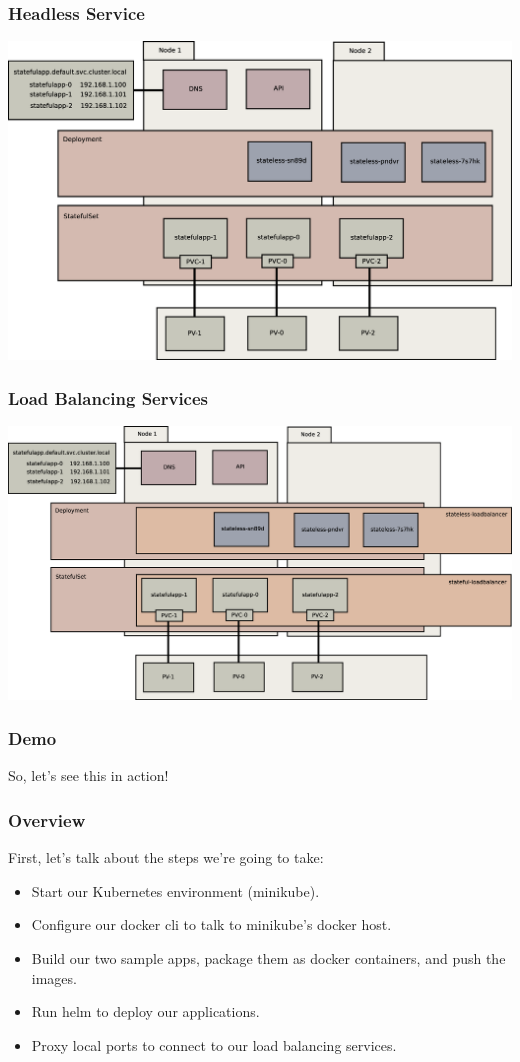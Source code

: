 \documentclass{beamer}
\begin{document}
\begin{frame}
    \frametitle{Headless Service}
    \includegraphics[width=\textwidth,height=\textheight,keepaspectratio]{graphics/07-persistentIdentity.eps}
\end{frame}

\begin{frame}
    \frametitle{Load Balancing Services}
    \includegraphics[width=\textwidth,height=\textheight,keepaspectratio]{graphics/08-loadBalancer.eps}
\end{frame}

\begin{frame}
    \frametitle{Demo}
    \begin{center}
        \Huge So, let's see this in action!
    \end{center}
\end{frame}

\begin{frame}
    \frametitle{Overview}
    First, let's talk about the steps we're going to take:
    \begin{itemize}
        \item Start our Kubernetes environment (minikube).
        \item Configure our docker cli to talk to minikube's docker host.
        \item Build our two sample apps, package them as docker containers, and push the images.
        \item Run helm to deploy our applications.
        \item Proxy local ports to connect to our load balancing services.
    \end{itemize}
\end{frame}
\end{document}
